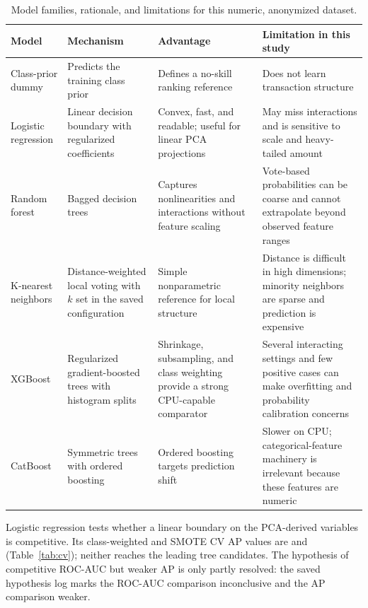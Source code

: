 \documentclass[journal]{IEEEtran}
\begin{document}
\begin{table}[!t]
\centering
\caption{Model families, rationale, and limitations for this numeric, anonymized dataset.}
\label{tab:model-rationale}
\begin{tabular}{p{}p{}p{}p{}}
\toprule
Model & Mechanism & Advantage & Limitation in this study \\
\midrule
Class-prior dummy & Predicts the training class prior & Defines a no-skill ranking reference & Does not learn transaction structure \\
Logistic regression & Linear decision boundary with regularized coefficients & Convex, fast, and readable; useful for linear PCA projections & May miss interactions and is sensitive to scale and heavy-tailed amount \\
Random forest & Bagged decision trees & Captures nonlinearities and interactions without feature scaling \cite{breiman2001} & Vote-based probabilities can be coarse and cannot extrapolate beyond observed feature ranges \\
K-nearest neighbors & Distance-weighted local voting with $k$ set in the saved configuration & Simple nonparametric reference for local structure & Distance is difficult in high dimensions; minority neighbors are sparse and prediction is expensive \\
XGBoost & Regularized gradient-boosted trees with histogram splits & Shrinkage, subsampling, and class weighting provide a strong CPU-capable comparator \cite{chen2016} & Several interacting settings and few positive cases can make overfitting and probability calibration concerns \\
CatBoost & Symmetric trees with ordered boosting & Ordered boosting targets prediction shift \cite{prokhorenkova2018} & Slower on CPU; categorical-feature machinery is irrelevant because these features are numeric \\
\bottomrule
\end{tabular}
\end{table}

Logistic regression tests whether a linear boundary on the PCA-derived variables is competitive. Its class-weighted and SMOTE CV AP values are \LRWeightsCVAP{} and \LRSmoteCVAP{} (Table~\ref{tab:cv}); neither reaches the leading tree candidates. The hypothesis of competitive ROC-AUC but weaker AP is only partly resolved: the saved hypothesis log marks the ROC-AUC comparison inconclusive and the AP comparison weaker.
\end{document}
